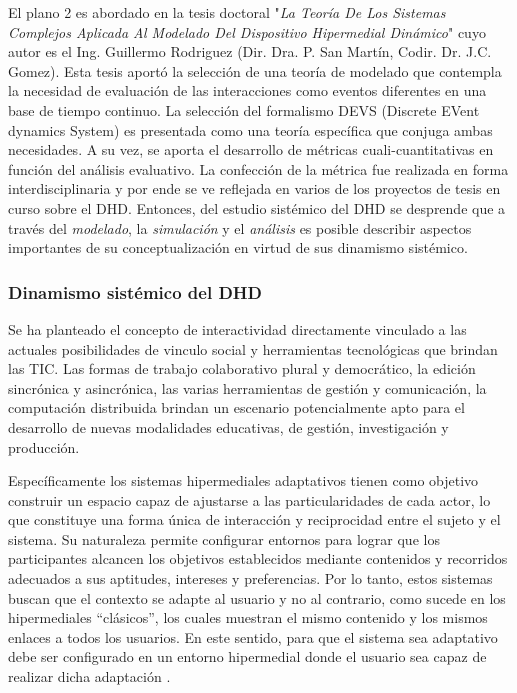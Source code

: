 El plano 2 es abordado en la tesis doctoral "\textit{La Teoría De Los Sistemas
Complejos Aplicada Al Modelado Del Dispositivo Hipermedial Dinámico}" cuyo autor es el Ing. Guillermo Rodriguez (Dir. Dra. P. San Martín, Codir. Dr. J.C. Gomez). Esta tesis aportó la selección de una teoría de
modelado que contempla la necesidad de evaluación de las interacciones como
eventos diferentes en una base de tiempo continuo. La selección del formalismo
DEVS (Discrete EVent dynamics System) es presentada como una teoría específica que
conjuga ambas necesidades. A su vez, se aporta el desarrollo de
métricas cuali-cuantitativas en función del análisis evaluativo. La confección de la métrica
fue realizada en forma interdisciplinaria y por ende se ve reflejada en varios de los proyectos de tesis en curso sobre el DHD. Entonces, del estudio sistémico del DHD se desprende que a través del
\textit{modelado}, la \textit{simulación} y el \textit{análisis} es  posible
describir aspectos importantes de su conceptualización en virtud de sus
dinamismo sistémico.


\subsubsection{Dinamismo sistémico del DHD}

Se ha planteado el concepto de interactividad directamente vinculado a las actuales posibilidades de vinculo social y herramientas tecnológicas que brindan las TIC.
Las formas de trabajo colaborativo plural y democrático, la edición sincrónica y asincrónica, las varias herramientas de gestión y comunicación, la computación distribuida brindan un escenario potencialmente apto para el desarrollo de nuevas modalidades educativas, de gestión, investigación y producción.

Específicamente los sistemas hipermediales adaptativos tienen como
objetivo construir un espacio capaz de ajustarse a las particularidades de cada
actor, lo que constituye una forma única de interacción y reciprocidad
entre el sujeto y el sistema. Su naturaleza permite configurar entornos para lograr que
los participantes alcancen los objetivos establecidos mediante contenidos y
recorridos adecuados a sus aptitudes, intereses y preferencias.
Por lo tanto, estos sistemas buscan que el contexto se adapte al usuario y
no al contrario, como sucede en los hipermediales “clásicos”, los cuales
muestran el mismo contenido y los mismos enlaces a todos los usuarios. En
este sentido, para que el sistema sea adaptativo debe ser configurado en un entorno
hipermedial donde el usuario sea capaz de realizar dicha adaptación
\cite{lxxviii}.

